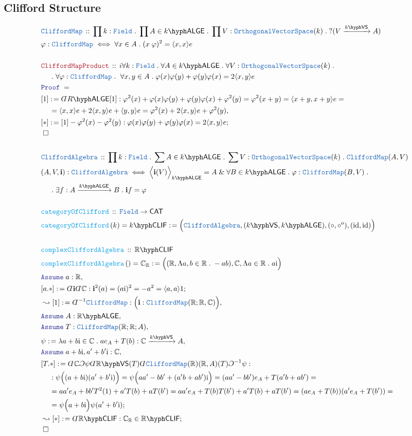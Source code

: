 \documentclass[12pt]{scrartcl}%
\newcommand{\TYPE}[1]{\textcolor{NavyBlue}{\mathtt{#1}}}%
\newcommand{\FUNC}[1]{\textcolor{Cerulean}{\mathtt{#1}}}%
\newcommand{\LOGIC}[1]{\textcolor{Blue}{\mathtt{#1}}}%
\newcommand{\THM}[1]{\textcolor{Maroon}{\mathtt{#1}}}%
\renewcommand{\.}{\; . \;} %
\newcommand{\de}{: \kern 0.1pc =} %
\newcommand{\Act}[1]{\left( #1 \right)} %
\newcommand{\Theorem}[2]{& \THM{#1} \, :: \, #2 \\ & \Proof = \\ } %
\newcommand{\DeclareType}[2]{& \TYPE{#1} \, :: \, #2 \\}%
\newcommand{\DefineType}[3]{& #1 : \TYPE{#2} \iff #3 \\}%
\newcommand{\DeclareFunc}[2]{& \FUNC{#1} \, :: \, #2 \\}%
\newcommand{\DefineNamedFunc}[4]{&  \FUNC{#1}\Act{#2} = #3 \de #4 \\}%
\newcommand{\NewLine}{\\ & \kern 1pc}%
\newcommand{\Page}[1]{ \begin{align*} #1 \end{align*}  }%
\newcommand{ \bd }{ \ByDef }%
\renewcommand{\And}{\; \& \;}%
\newcommand{\Reals}{\mathbb{R}}%
\newcommand{\Complex}{\mathbb{C}}%
\DeclareMathOperator*{\id}{id}%
\newcommand{\Say}[3]{& #1 \de #2 : #3, \\} %
\newcommand{\Conclude}[3]{& #1 \de #2 : #3; \\}%
\newcommand{\Derive}[3]{& \leadsto #1 \de #2 : #3, \\} %
\newcommand{\DeriveConclude}[3]{& \leadsto #1 \de #2 : #3 ; \\} %
\newcommand{\Assume}[2]{& \LOGIC{Assume} \; #1 : #2, \\} %
\newcommand{\QED}{\; \square} %
\newcommand{\EndProof}{& \QED \\} %
\newcommand{\ByDef}{\rotatebox[origin=c]{-180}{$D$}}%
\newcommand{\ByConstr}{\rotatebox[origin=c]{-180}{$C$}}%
\newcommand{\Proof}{\LOGIC{Proof} \; } %
\newcommand{\Arrow}[1]{\xrightarrow{#1}}%
\newcommand{\CAT}{\mathsf{CAT}} %
\newcommand{\OVS}{\TYPE{OrthogonalVectorSpace}}
\newcommand{\VS}[1]{#1\hyph\mathsf{VS}} %
\newcommand{\Field}{\TYPE{Field}}
\newcommand{\LALGE}[1]{#1\hyph\mathsf{ALGE}}%
\newcommand{\CLIF}[1]{#1\hyph\mathsf{CLIF}}%
\begin{document}
\subsection{Clifford Structure}
\Page{
	\DeclareType{CliffordMap}{
		\prod k : \Field \. 
		\prod A \in \LALGE{k} \.
		\prod V : \OVS(k) \.
		?( V \Arrow{\VS{k}}  A)
	}
	\DefineType{\varphi}{CliffordMap}{ \forall x \in A \. (x \;\varphi)^2 = \langle x, x\rangle e   }
	\\
	\Theorem{CliffordMapProduct}{i
		\forall k : \Field \.
		\forall A \in \LALGE{k} \.
		\forall V : \OVS(k) \. \NewLine \. 
		\forall \varphi : \TYPE{CliffordMap} \.\
		\forall x,y \in A \.
		\varphi(x)\varphi(y) + \varphi(y)\varphi(x) = 2\langle x, y\rangle e
	}
	\Say{[1]}{ \bd \LALGE{R}[1]   }
	{
		\varphi^2(x)  + \varphi(x)\varphi(y) + \varphi(y)\varphi(x) + \varphi^2(y) =
		\varphi^2(x + y) = \langle x + y, x + y  \rangle e    = \NewLine =  
		\langle x, x \rangle e  + 2 \langle x, y \rangle e +   \langle y, y \rangle e = 
		\varphi^2(x)  + 2 \langle x, y \rangle e + \varphi^2(y)
	}
	\Conclude{[*]}{[1] - \varphi^2(x) - \varphi^2(y) }{ \varphi(x)\varphi(y) + \varphi(y)\varphi(x)  =  2 \langle x, y \rangle e } 
	\EndProof
	\\
	\DeclareType{CliffordAlgebra}{ \prod k : \Field \. \sum A \in \LALGE{k} \. \sum V : \OVS(k) \. \TYPE{CliffordMap}(A,V) }
	\DefineType{(A,V,\mathbf{i})}{CliffordAlgebra}{ 
		\Big\langle \mathbf{i}(V) \Big\rangle_{\LALGE{k}} = A 
		\And \forall B \in \LALGE{k} \. \varphi : \TYPE{CliffordMap}(B,V) \.  \NewLine \. 
		\exists f : A \Arrow{\LALGE{k}} B \. \mathbf{i} f = \varphi
	}
	\\
	\DeclareFunc{categoryOfClifford}
	{
		\Field  \to \CAT
	}
	\DefineNamedFunc{categoryOfClifford}{k}{\CLIF{k}}
	{\Big(\TYPE{CliffordAlgebra},(\VS{k},\LALGE{k}),(\circ,\circ^o),(\id,\id)\Big)}
	\\
	\DeclareFunc{complexCliffordAlgebra}{\CLIF{\Reals}}
	\DefineNamedFunc{complexCliffordAlgebra}{}{\Complex_\Reals}{
		\Big( 
			(\Reals ,\Lambda a,b \in \Reals \. -ab) , 
			\Complex, \Lambda a \in \Reals \. a\mathrm{i} 
		\Big)
	}
	\Assume{a}{\Reals}
	\Conclude{[a.*]}{\bd \mathbf{i}\bd \Complex }{ \mathbf{i}^2(a) = (a\mathrm{i})^2 = -a^2 = \langle a, a\rangle 1  }
	\Derive{[1]}{\bd^{-1}\TYPE{CliffordMap}}{\Big( \mathbf{i} : \TYPE{CliffordMap}(\Reals;\Reals,\Complex) \Big)}
	\Assume{A}{\LALGE{\Reals}}
	\Assume{T}{\TYPE{CliffordMap}(\Reals;\Reals;A)}
	\Say{\psi}{\lambda a + b\mathrm{i} \in \Complex \. ae_A + T(b)}{\Complex \Arrow{\VS{k}} A }
	\Assume{ a + b\mathrm{i},a' + b'\mathrm{i}  }{\Complex}
	\Conclude{[T.*]}{\bd \Complex \ByConstr \psi \bd \VS{\Reals}(T)\bd \TYPE{CliffordMap}(\Reals)(\Reals,A)(T)\ByConstr^{-1}\psi}
	{
		\NewLine : 
		\psi\Big( (a + b\mathrm{i})(a' + b'\mathrm{i})  \Big) =
		\psi\Big( aa' - bb' + (a'b + ab' )\mathrm{i}  \Big) = 
		(aa' - bb')e_A  + T(a'b + ab')  = \NewLine = 
		aa'e_A  +  bb'T^2(1)  + a'T(b) + aT(b') =  
		aa'e_A  +  T(b)T(b')  + a'T(b) + aT(b') = 	
		(ae_A + T(b))(a'e_A  + T(b')  ) = \NewLine = 
		\psi\Big( a + b\mathrm{i}  \Big)\psi(a' + b'\mathrm{i})
	}
	\DeriveConclude{[*]}{\bd \CLIF{\Reals}}{\Complex_\Reals \in \CLIF{\Reals}}
	\EndProof
}
\end{document}
